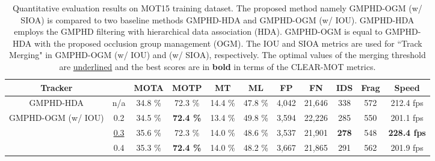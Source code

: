 \documentclass[journal]{IEEEtran}
\newcounter{ct}
\begin{document}
\begin{table*}[t]
\centering
\caption{Quantitative evaluation results on MOT15 training dataset. The proposed method namely GMPHD-OGM (w/ SIOA) is compared to two baseline methods GMPHD-HDA and GMPHD-OGM (w/ IOU). GMPHD-HDA employs the GMPHD filtering with hierarchical data association (HDA). GMPHD-OGM is equal to GMPHD-HDA with the proposed occlusion group management (OGM). The IOU and SIOA metrics are used for ``Track Merging" in GMPHD-OGM (w/ IOU) and (w/ SIOA), respectively. The optimal values of the merging threshold  are \underline{underlined} and the best scores are in \textbf{bold} in terms of the CLEAR-MOT metrics.}
\label{table:eval_train_mot15}
 \begin{tabular}{|c|c|ccccccccc|} 
        
            \hline
             \footnotesize{Tracker} &  & \footnotesize{MOTA} &  \footnotesize{MOTP} & \footnotesize{MT} &  \footnotesize{ML} &  \footnotesize{FP} &  \footnotesize{FN} &  \footnotesize{IDS} & \footnotesize{Frag} &  \footnotesize{Speed} \\ 
             \hline\hline
             
            
           \footnotesize{GMPHD-HDA} & n/a & \footnotesize{34.8 \%} &  \footnotesize{72.3 \%} &  \footnotesize{14.4 \%} &
           \footnotesize{47.8 \%} &  
           \footnotesize{4,042} &  \footnotesize{21,646} &  \footnotesize{338} &  \footnotesize{572} &  \footnotesize{212.4 fps}  \\ 
           \hline
           
           \multirow{4}{*}{GMPHD-OGM (w/ IOU)}
            & 0.2 & \footnotesize{34.5 \%} &  \footnotesize{\textbf{72.4 \%}} &  \footnotesize{13.4 \%} &  \footnotesize{49.8 \%} &  
           \footnotesize{3,594} &  \footnotesize{22,226} &  \footnotesize{285} &  \footnotesize{550} &  \footnotesize{201.1 fps}  \\ 
           
            & \underline{0.3} & \footnotesize{35.6 \%} &  \footnotesize{72.3 \%} &  \footnotesize{14.0 \%} &  \footnotesize{48.6 \%} &  
           \footnotesize{3,537} &  \footnotesize{21,901} &  \footnotesize{\textbf{278}} &  \footnotesize{548} &  \footnotesize{\textbf{228.4 fps}}  \\ 
           
           & 0.4 & \footnotesize{35.3 \%} &  \footnotesize{\textbf{72.4 \%}} &  \footnotesize{14.0 \%} &  \footnotesize{48.2 \%} &  
           \footnotesize{3,667} &  \footnotesize{21,865} &  \footnotesize{291} &  \footnotesize{562} &  \footnotesize{201.9 fps}  \\ 
           

\end{tabular}
\end{table*}
\end{document}
